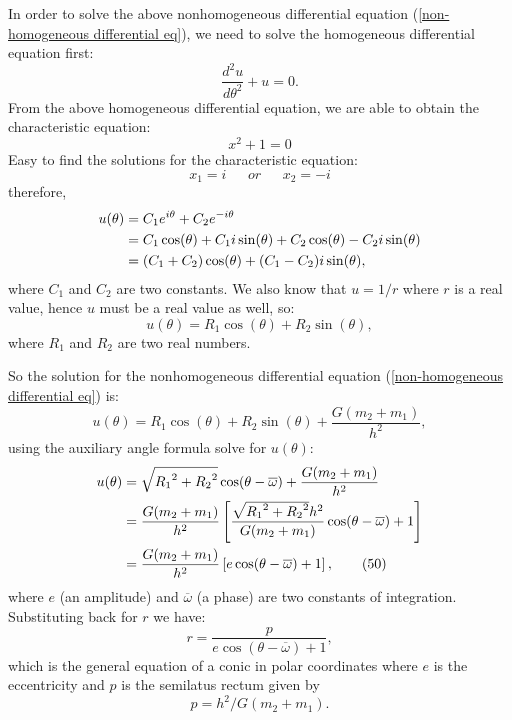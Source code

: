 In order to solve the above nonhomogeneous differential equation (\ref{non-homogeneous differential eq}), we need to solve the homogeneous differential equation first:
\begin{equation}
    \frac{d^2u}{d\theta^2} + u = 0.
    \tag{45}
\end{equation}
From the above homogeneous differential equation, we are able to obtain the characteristic equation:
\begin{equation}
    x^2 + 1 = 0
    \tag{46}
\end{equation}
Easy to find the solutions for the characteristic equation:
\begin{equation}
    x_1 = i ~~~~~~~or~~~~~~~ x_2 = -i
    \tag{47}
\end{equation}
therefore,
\begin{align}
    u(\theta)
    & = C_1e^{i\theta} + C_2e^{-i\theta} \notag\\
    & = C_1 \cos(\theta) + C_1 i \sin(\theta) + C_2 \cos(\theta) - C_2 i \sin(\theta) \notag\\
    & = (C_1 + C_2) \cos(\theta) + (C_1 - C_2) i \sin(\theta),
\end{align}
where $C_1$ and $C_2$ are two constants.
We also know that $u = 1/r$ where $r$ is a real value, hence $u$ must be a real value as well, so:
\begin{equation}
    u(\theta) = R_1 \cos(\theta) + R_2 \sin(\theta),
    \tag{48}
\end{equation}
where $R_1$ and $R_2$ are two real numbers.

So the solution for the nonhomogeneous differential equation (\ref{non-homogeneous differential eq}) is:
\begin{equation}
    u(\theta) = R_1 \cos(\theta) + R_2 \sin(\theta) + \frac{G(m_{2}+m_{1})}{h^2},
    \tag{49}
\end{equation}
using the auxiliary angle formula solve for $u(\theta)$:
\begin{align}
    u(\theta) 
    & = \sqrt{{R_1}^2 + {R_2}^2} \cos(\theta - \overline{\omega}) + \frac{G(m_{2}+m_{1})}{h^2} \notag\\
    & = \frac{G(m_{2}+m_{1})}{h^2} \left[ \frac{\sqrt{{R_1}^2 + {R_2}^2} h^2}{G(m_{2}+m_{1})} \cos(\theta - \overline{\omega}) + 1 \right] \notag\\
    & = \frac{G(m_{2}+m_{1})}{h^2} \left[ e \cos(\theta - \overline{\omega}) + 1 \right],
    \tag{50}
\end{align}
where $e$ (an amplitude) and $\overline{\omega}$ (a phase) are two constants of integration. Substituting back for $r$ we have:
\begin{equation}
    r = \frac{p}{e \cos(\theta - \overline{\omega}) + 1},
    \tag{51}
\end{equation}
which is the general equation of a conic in polar coordinates where $e$ is the eccentricity and $p$ is the semilatus rectum given by
\begin{equation}
    p = h^2 / G(m_{2}+m_{1}).
    \label{p and h relation}
    \tag{52}
\end{equation}

